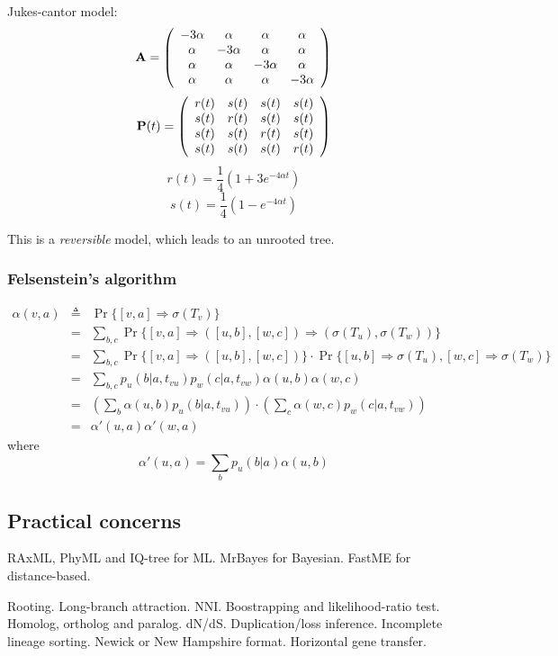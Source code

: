 \documentclass[10pt]{article}
\begin{document}
Jukes-cantor model:
\[
{\bf A}=\left(\begin{array}{cccc}
-3\alpha & \alpha & \alpha & \alpha \\
\alpha & -3\alpha & \alpha & \alpha \\
\alpha & \alpha & -3\alpha & \alpha \\
\alpha & \alpha & \alpha & -3\alpha \\
\end{array}\right)
\]
\[
{\bf P}(t)=\left(\begin{array}{cccc}
r(t) & s(t) & s(t) & s(t) \\
s(t) & r(t) & s(t) & s(t) \\
s(t) & s(t) & r(t) & s(t) \\
s(t) & s(t) & s(t) & r(t) \\
\end{array}\right)
\]
\[
r(t)=\frac{1}{4}(1+3e^{-4\alpha t})
\]
\[
s(t)=\frac{1}{4}(1-e^{-4\alpha t})
\]

This is a \emph{reversible} model, which leads to an unrooted tree.
\subsubsection{Felsenstein's algorithm}

\begin{eqnarray*}
\alpha(v,a)&\triangleq&\Pr\{[v,a]\Rightarrow\sigma(T_v)\}\\
&=&\sum_{b,c}\Pr\big\{[v,a]\Rightarrow([u,b],[w,c])\Rightarrow(\sigma(T_u),\sigma(T_w))\big\}\\
&=&\sum_{b,c}\Pr\big\{[v,a]\Rightarrow([u,b],[w,c])\big\}\cdot\Pr\big\{[u,b]\Rightarrow\sigma(T_u),[w,c]\Rightarrow\sigma(T_w)\big\}\\
&=&\sum_{b,c}p_u(b|a,t_{vu})p_w(c|a,t_{vw})\alpha(u,b)\alpha(w,c)\\
&=&\left(\sum_b \alpha(u,b)p_u(b|a,t_{vu})\right)\cdot\left(\sum_c \alpha(w,c)p_w(c|a,t_{vw})\right)\\
&=&\alpha'(u,a)\alpha'(w,a)
\end{eqnarray*}
where
$$ \alpha'(u,a)=\sum_b p_u(b|a)\alpha(u,b) $$

\subsection{Practical concerns}

RAxML, PhyML and IQ-tree for ML. MrBayes for Bayesian. FastME for
distance-based.

Rooting. Long-branch attraction. NNI. Boostrapping and likelihood-ratio test.
Homolog, ortholog and paralog. dN/dS.  Duplication/loss inference. Incomplete
lineage sorting. Newick or New Hampshire format. Horizontal gene transfer.
\end{document}
